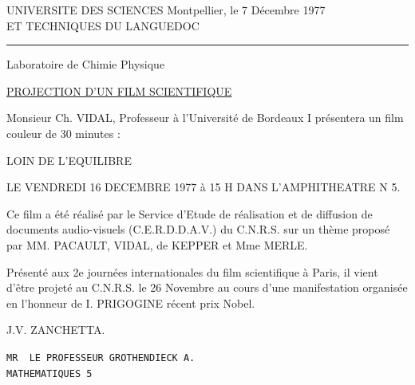 UNIVERSITE DES SCIENCES \hfill Montpellier, le 7 Décembre 1977\\
ET TECHNIQUES DU LANGUEDOC\\
\hspace*{2em}\rule{3.3em}{0.4pt}

Laboratoire de Chimie Physique

\begin{center}\uline{PROJECTION D'UN FILM SCIENTIFIQUE}\end{center}

Monsieur Ch. VIDAL, Professeur à l'Université de Bordeaux I présentera un film couleur de 30 minutes :

\begin{center}\textquotedbl{}LOIN DE L'EQUILIBRE\textquotedbl{}\end{center}

LE VENDREDI 16 DECEMBRE 1977 à 15 H DANS L'AMPHITHEATRE N\textdegree{} 5.

Ce film a été réalisé par le Service d'Etude de réalisation et de diffusion de documents audio-visuels (C.E.R.D.D.A.V.) du C.N.R.S. sur un thème proposé par MM. PACAULT, VIDAL, de KEPPER et Mme MERLE.

Présenté aux 2e journées internationales du film scientifique à Paris, il vient d'être projeté au C.N.R.S. le 26 Novembre au cours d'une manifestation organisée en l'honneur de I. PRIGOGINE récent prix Nobel.

\hfill J.V. ZANCHETTA.

\texttt{MR \ LE PROFESSEUR GROTHENDIECK A.}\\
\texttt{MATHEMATIQUES \hspace{7em} 5}
